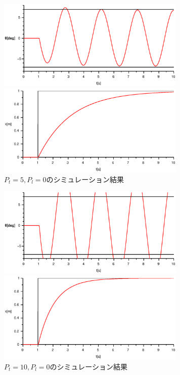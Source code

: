 \documentclass[titlepage]{jsarticle}
\begin{document}
            \begin{figure}[h]
                \begin{minipage}{0.5\hsize}
                    \centering
                    \includegraphics[width=9cm]{img/P5-0t.eps}
                \end{minipage}
                \begin{minipage}{0.5\hsize}
                    \centering
                    \includegraphics[width=9cm]{img/P5-0x.eps}
                \end{minipage}
                \caption{$P_t = 5, P_l = 0$のシミュレーション結果}
                \label{fig:p5-0}
            \end{figure}
            \begin{figure}[h]
                \begin{minipage}{0.5\hsize}
                    \centering
                    \includegraphics[width=9cm]{img/P10-0t.eps}
                \end{minipage}
                \begin{minipage}{0.5\hsize}
                    \centering
                    \includegraphics[width=9cm]{img/P10-0x.eps}
                \end{minipage}
                \caption{$P_t = 10, P_l = 0$のシミュレーション結果}
                \label{fig:p10-0}
            \end{figure}
\end{document}
